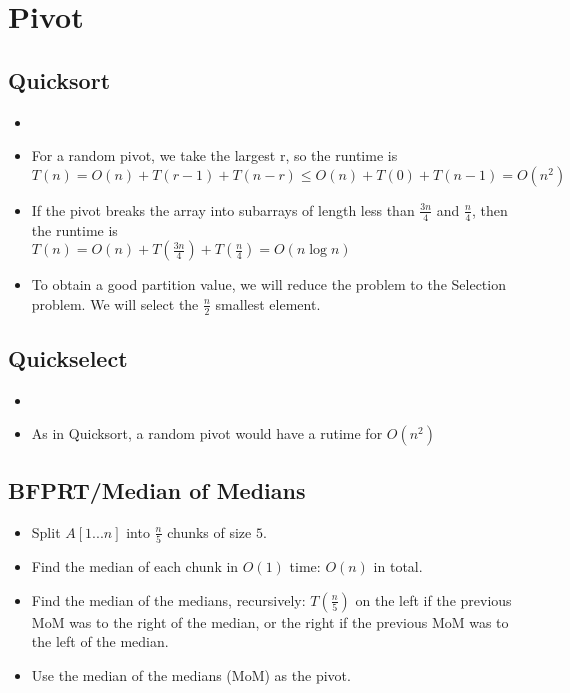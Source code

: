 
\section{Pivot}

\subsection{Quicksort}
\begin{itemize}
    \item[] 
    \item For a random pivot, we take the largest r, so the runtime is \\ 
    $T(n) = O(n) + T(r - 1) + T(n - r) \leq O(n) + T(0) + T(n - 1) = O(n^2)$
    \item If the pivot breaks the array into subarrays of length less than $\frac{3n}{4}$ and $\frac{n}{4}$, then the runtime is \\
    $T(n) = O(n) + T(\frac{3n}{4}) + T(\frac{n}{4}) = O(n\log n)$
    \item To obtain a good partition value, we will reduce the problem to the Selection problem. We will select the $\frac{n}{2}$ smallest element.
\end{itemize}

\subsection{Quickselect}
\begin{itemize}
    \item[] 
    \item As in Quicksort, a random pivot would have a rutime for $O(n^2)$
\end{itemize}

\subsection{BFPRT/Median of Medians}
\begin{itemize}
    \item Split $A[1...n]$ into $\frac{n}{5}$ chunks of size $5$.
    \item Find the median of each chunk in $O(1)$ time: $O(n)$ in total.
    \item Find the median of the medians, recursively: $T(\frac{n}{5})$ on the left if the previous MoM was to the right of the median, or the right if the previous MoM was to the left of the median.
    \item Use the median of the medians (MoM) as the pivot.
\end{itemize}


